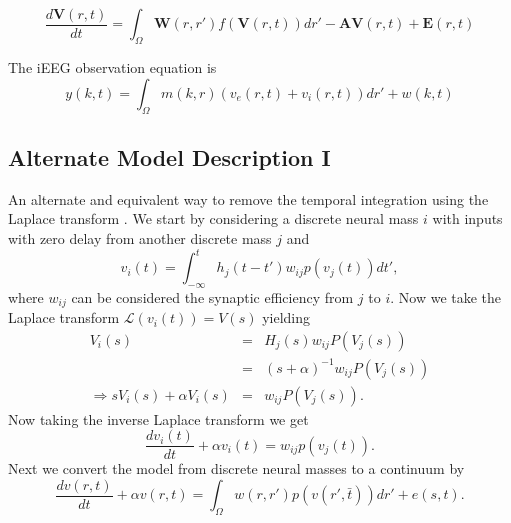 \documentclass[onecolumn,draftcls]{IEEEtran}
\begin{document}
\begin{equation}\label{matrix_equation_in_vector_notation}
   \frac{d\mathbf{V}(r,t)}{dt} = \int_\Omega \mathbf{W}(r,r')f\left(\mathbf{V}(r,t)\right)dr' - \mathbf{A}\mathbf{V}(r,t) + \mathbf{E}(r,t)
\end{equation}

The iEEG observation equation is
\begin{equation}\label{iEEGObservationEquation}
    y(k,t) = \int_{\Omega} m(k,r)\left(v_e(r,t) + v_i(r,t)\right)dr' + w(k,t)
\end{equation}

\subsection{Alternate Model Description I}
An alternate and equivalent way to remove the temporal integration using the Laplace transform . We start by considering a discrete neural mass $i$ with inputs with zero delay from another discrete mass $j$ and
\begin{equation}\label{TwoDiscreteMasses}
{v_i}\left( t \right) = \int_{ - \infty }^t {{h_j}(t - t'){w_{ij}}p\left( {{v_j}\left( t \right)} \right)dt'},
\end{equation}
where $w_{ij}$ can be considered the synaptic efficiency from $j$ to $i$. Now we take the Laplace transform $\mathcal{L}(v_i(t))=V(s)$ yielding
\begin{eqnarray}
  {V_i}\left( s \right) &=& {H_j}\left( s \right){w_{ij}}P\left( {{V_j}\left( s \right)} \right) \nonumber \\
   &=& {\left( {s + \alpha} \right)^{ - 1}}{w_{ij}}P\left( {{V_j}\left( s \right)} \right)  \\
  \Rightarrow s{V_i}\left( s \right) + \alpha{V_i}\left( s \right) &=& {w_{ij}}P\left( {{V_j}\left( s \right)} \right).
\end{eqnarray}
Now taking the inverse Laplace transform we get
\begin{equation}\label{InverseLaplace}
\frac{{d{v_i}\left( t \right)}}{{dt}} + \alpha{v_i}\left( t \right) = {w_{ij}}p\left( {{v_j}\left( t \right)} \right).
\end{equation}
Next we convert the model from discrete neural masses to a continuum by
\begin{equation}\label{Discrete2Continuum}
\frac{{dv\left( {r,t} \right)}}{{dt}} + \alpha{v\left( {r,t} \right)} = \int_\Omega  {w\left( {r,r'} \right)p\left( {v\left( {r',\bar t} \right)} \right)dr'}  + e\left( {s,t} \right).
\end{equation}
\end{document}
